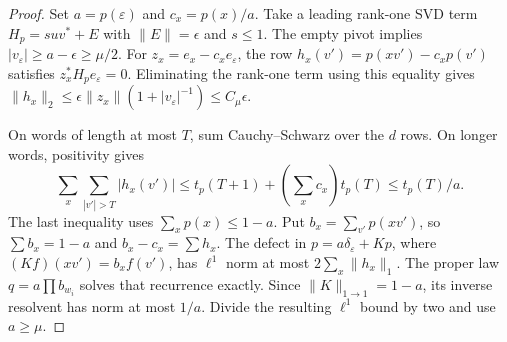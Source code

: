 \begin{proof}
Set $a=p(\varepsilon)$ and $c_x=p(x)/a$. Take a leading rank-one SVD
term $H_p=su v^*+E$ with $\|E\|=\epsilon$ and $s\le1$.
The empty pivot implies $|v_\varepsilon|\ge a-\epsilon\ge\mu/2$.
For $z_x=e_x-c_xe_\varepsilon$, the row
$h_x(v')=p(xv')-c_xp(v')$ satisfies $z_x^*H_pe_\varepsilon=0$.
Eliminating the rank-one term using this equality gives
$\|h_x\|_2\le\epsilon\|z_x\|(1+|v_\varepsilon|^{-1})
\le C_\mu\epsilon$.

On words of length at most $T$, sum Cauchy--Schwarz over the $d$ rows.
On longer words, positivity gives
\[
 \sum_x\sum_{|v'|>T}|h_x(v')|
 \le t_p(T+1)+\left(\sum_xc_x\right)t_p(T)
 \le t_p(T)/a.
\]
The last inequality uses $\sum_xp(x)\le1-a$. Put
$b_x=\sum_{v'}p(xv')$, so $\sum b_x=1-a$ and
$b_x-c_x=\sum h_x$. The defect in
$p=a\delta_\varepsilon+Kp$, where $(Kf)(xv')=b_xf(v')$, has
$\ell^1$ norm at most $2\sum_x\|h_x\|_1$.
The proper law $q=a\prod b_{w_i}$ solves that recurrence exactly.
Since $\|K\|_{1\to1}=1-a$, its inverse resolvent has norm at most
$1/a$. Divide the resulting $\ell^1$ bound by two and use $a\ge\mu$.
\end{proof}

